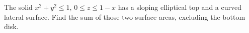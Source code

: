 The solid $ x^2+y^2\le1 $, $ 0\le z\le1-x $ has a sloping elliptical top and a curved lateral surface. Find the sum of those two surface areas, excluding the bottom disk.
